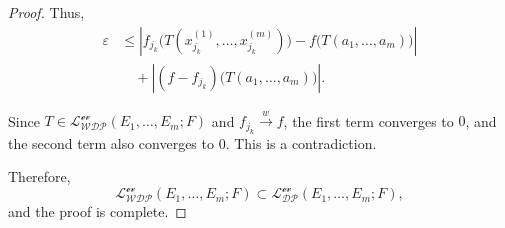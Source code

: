 \documentclass[10pt,a4paper]{amsart}
\begin{document}
\begin{proof}
	Thus,
	\begin{align*}
		\varepsilon 
		&\le \left| f_{j_k}\big(T(x_{j_k}^{(1)},\dots, x_{j_k}^{(m)})\big) - f\big(T(a_1,\dots, a_m)\big) \right| \\
		&\quad + \left| (f - f_{j_k})\big(T(a_1,\dots, a_m)\big) \right|.
	\end{align*}
	
	Since $T \in \mathcal{L_{WDP}^{\text{ev}}}(E_1,\dots, E_m; F)$ and $f_{j_k} \overset{w}{\longrightarrow} f$, the first term converges to $0$, and the second term also converges to $0$. This is a contradiction.
	
	Therefore,
	\[
	\mathcal{L_{WDP}^{\text{ev}}}(E_1,\dots, E_m; F) \subset \mathcal{L_{DP}^{\text{ev}}}(E_1,\dots, E_m; F),
	\]
	and the proof is complete.
\end{proof}
\end{document}
